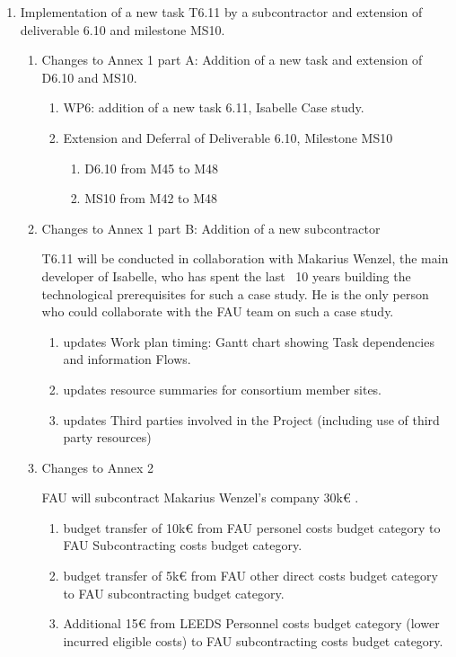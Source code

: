 \begin{enumerate}
\item Implementation of a new task T6.11 by a subcontractor and extension of deliverable 6.10 and milestone MS10.

\begin{enumerate}
\item Changes to Annex 1 part A: Addition of a new task and extension of D6.10 and MS10.
\begin{enumerate}
\item WP6: addition of a new task 6.11, Isabelle Case study.
\item Extension and Deferral of Deliverable 6.10, Milestone MS10
\begin{enumerate}
\item D6.10 from M45 to M48 
\item MS10 from M42 to M48
\end{enumerate}
\end{enumerate}

\item Changes to Annex 1 part B: Addition of a new subcontractor

T6.11 will be conducted in collaboration with Makarius Wenzel, the main developer of Isabelle, who has spent the last ~10 years building the technological prerequisites for such a case study. He is the only person who could collaborate with the FAU team on such a case study.
\begin{enumerate}
\item updates Work plan timing: Gantt chart showing Task dependencies and information Flows.
\item updates resource summaries for consortium member sites.
\item updates Third parties involved in the Project (including use of third party resources)
\end{enumerate}

\item Changes to Annex 2 

FAU will subcontract Makarius Wenzel's company 30k€ . 
\begin{enumerate}
\item budget transfer of 10k€ from FAU personel costs budget category to FAU Subcontracting costs budget category.
\item budget transfer of 5k€ from FAU other direct costs budget category to FAU subcontracting budget category.
\item Additional 15€ from LEEDS Personnel costs budget category (lower incurred eligible costs) to FAU subcontracting costs budget category.
\end{enumerate}
\end{enumerate}


\end{enumerate}
